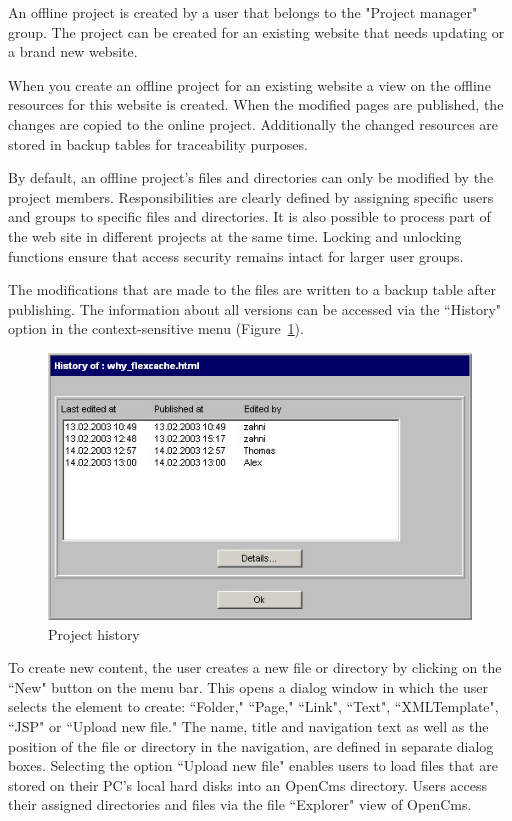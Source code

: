 An offline project is created by a user that belongs to the
"Project manager" group. The project can be created for an
existing website that needs updating or a brand new website.

When you create an offline project for an existing website a view
on the offline resources for this website is created. When the
modified pages are published, the changes are copied to the online
project. Additionally the changed resources are stored in backup
tables for traceability purposes.

By default, an offline project's files and directories can only be
modified by the project members. Responsibilities are clearly
defined by assigning specific users and groups to specific files
and directories. It is also possible to process part of the web
site in different projects at the same time. Locking and unlocking
functions ensure that access security remains intact for larger
user groups.

The modifications that are made to the files are written to a
backup table after publishing. The information about all versions can
be accessed via the ``History" option in the context-sensitive menu
(Figure~\ref{history01}).

\begin{figure}[!hbt]
\begin{center}
\includegraphics[width=\sgw]
                   {pics/usermanual/history01}
\caption[Project history]
           {Project history}
\label{history01}
\end{center}
\end{figure}

To create new content, the user creates a new file or directory by
clicking on the ``New" button on the menu bar. This opens a dialog
window in which the user selects the element to create: ``Folder,"
``Page," ``Link", ``Text", ``XMLTemplate", ``JSP" or ``Upload new file." The
name, title and navigation text as well as the position of the file
or directory in the navigation, are defined in separate dialog
boxes. Selecting the option ``Upload new file" enables users to load
files that are stored on their PC's local hard disks into an
OpenCms directory. Users access their assigned directories and
files via the file ``Explorer" view of OpenCms.

